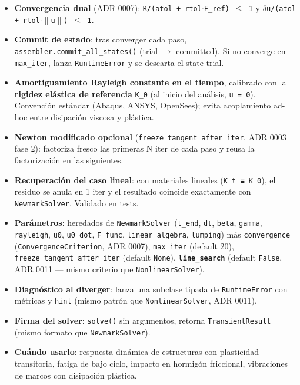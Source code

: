 \documentclass[11pt,letterpaper,oneside]{report}
\begin{document}
\begin{itemize}
  \item \textbf{Convergencia dual} (ADR 0007): \texttt{R/(atol + rtol\ensuremath{\cdot}F\_ref) \ensuremath{\le} 1} y \texttt{\ensuremath{\delta}u/(atol + rtol\ensuremath{\cdot}\ensuremath{\|}u\ensuremath{\|}) \ensuremath{\le} 1}.
  \item \textbf{Commit de estado}: tras converger cada paso, \texttt{assembler.commit\_all\_states()} (trial \ensuremath{\to} committed). Si no converge en \texttt{max\_iter}, lanza \texttt{RuntimeError} y se descarta el state trial.
  \item \textbf{Amortiguamiento Rayleigh constante en el tiempo}, calibrado con la \textbf{rigidez elástica de referencia} \texttt{K\_0} (al inicio del análisis, \texttt{u = 0}). Convención estándar (Abaqus, ANSYS, OpenSees); evita acoplamiento ad-hoc entre disipación viscosa y plástica.
  \item \textbf{Newton modificado opcional} (\texttt{freeze\_tangent\_after\_iter}, ADR 0003 fase 2): factoriza fresco las primeras N iter de cada paso y reusa la factorización en las siguientes.
  \item \textbf{Recuperación del caso lineal}: con materiales lineales (\texttt{K\_t ≡ K\_0}), el residuo se anula en 1 iter y el resultado coincide exactamente con \texttt{NewmarkSolver}. Validado en tests.
  \item \textbf{Parámetros}: heredados de \texttt{NewmarkSolver} (\texttt{t\_end}, \texttt{dt}, \texttt{beta}, \texttt{gamma}, \texttt{rayleigh}, \texttt{u0}, \texttt{u0\_dot}, \texttt{F\_func}, \texttt{linear\_algebra}, \texttt{lumping}) más \texttt{convergence} (\texttt{ConvergenceCriterion}, ADR 0007), \texttt{max\_iter} (default 20), \texttt{freeze\_tangent\_after\_iter} (default \texttt{None}), \textbf{\texttt{line\_search}} (default \texttt{False}, ADR 0011 --- mismo criterio que \texttt{NonlinearSolver}).
  \item \textbf{Diagnóstico al diverger}: lanza una subclase tipada de \texttt{RuntimeError} con métricas y \texttt{hint} (mismo patrón que \texttt{NonlinearSolver}, ADR 0011).
  \item \textbf{Firma del solver}: \texttt{solve()} sin argumentos, retorna \texttt{TransientResult} (mismo formato que \texttt{NewmarkSolver}).
  \item \textbf{Cuándo usarlo}: respuesta dinámica de estructuras con plasticidad transitoria, fatiga de bajo ciclo, impacto en hormigón friccional, vibraciones de marcos con disipación plástica.

\end{itemize}
\end{document}
